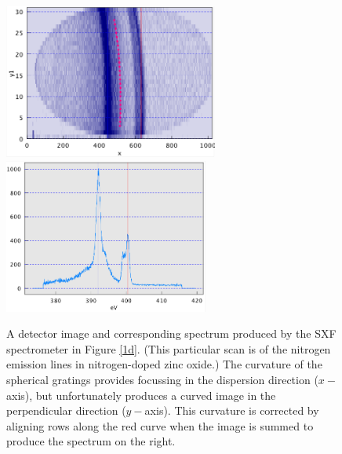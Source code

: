 \begin{figure}[htbp] %
   \centering
   \includegraphics[height=2in]{../data/Chapter1/1e_spectrometerData/1e_image.png} \includegraphics[height=2in]{../data/Chapter1/1e_spectrometerData/1e_spectrum.png}
   \caption[A detector image and corresponding spectrum produced by the SXF spectrometer in Figure \protect \ref{1d}.]{A detector image and corresponding spectrum produced by the SXF spectrometer in Figure \protect \ref{1d}.  (This particular scan is of the nitrogen emission lines in nitrogen-doped zinc oxide.)  The curvature of the spherical gratings provides focussing in the dispersion direction ($x-$axis), but unfortunately produces a curved image in the perpendicular direction ($y-$axis).  This curvature is corrected by aligning rows along the red curve when the image is summed to produce the spectrum on the right.}
   \label{1e}
\end{figure}

